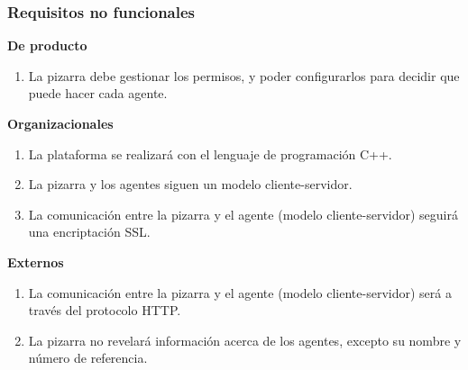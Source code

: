 \subsubsection{Requisitos no funcionales}
\textbf{De producto}
	\begin{enumerate}
		\item La pizarra debe gestionar los permisos, y poder configurarlos para decidir que puede hacer cada agente.
	\end{enumerate}
\textbf{Organizacionales}
	\begin{enumerate}
		\item La plataforma se realizará con el lenguaje de programación C++.
		\item La pizarra y los agentes siguen un modelo cliente-servidor.
		\item La comunicación entre la pizarra y el agente (modelo cliente-servidor) seguirá una encriptación SSL.
	\end{enumerate}
\textbf{Externos}
	\begin{enumerate}
		\item La comunicación entre la pizarra y el agente (modelo cliente-servidor) será a través del protocolo HTTP.
		\item La pizarra no revelará información acerca de los agentes, excepto su nombre y número de referencia.
	\end{enumerate}
